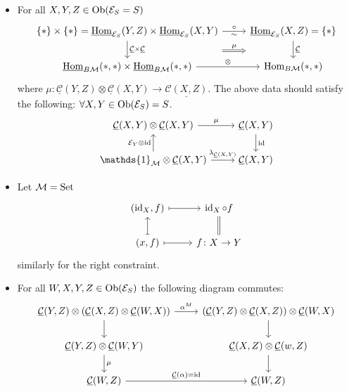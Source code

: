 \begin{exmp}
\begin{itemize}
		\item 
		For all $ X , Y , Z \in \operatorname{Ob} ( \mathcal{ E }_S = S ) $
		\[
		\begin{tikzcd}
			\{ * \} \times \{ * \} = \underline{\Hom}_{\mathcal{ E }_S } ( Y , Z ) \times \underline{ \Hom }_{ \mathcal{ E }_S } ( X , Y )
			\ar[r, "\sim"', "\circ"]
			\ar[r,shift right =2em, Rightarrow, "\mu"]
			\ar[d, "\underline{ \mathcal{ C } } \times \underline{ \mathcal{ C } }"]
			&
			\underline{\Hom}_{\mathcal{E}_S}( X , Z ) = \{ * \}
			\ar[d, "\underline{\mathcal{C}}"]
			\\
			\underline{\Hom}_{B\mathcal{ M } } ( * , * ) \times
			\underline{\Hom}_{B \mathcal{ M } } ( * , * )
			\ar[r, "\otimes"]
			&
			\Hom_{B\mathcal{ M } } ( * , * )
		\end{tikzcd}
		\]
		where $ \mu \colon \underline{\mathcal{ C }}( Y , Z ) \otimes \underline{ \mathcal{ C } } ( X , Y ) \to \underline{ \mathcal{ C } ( X , Z ) }$.
		The above data should satisfy the following:
		$ \forall X , Y \in \operatorname{Ob} ( \mathcal{ E }_S ) = S $.
		\[
		\begin{tikzcd}
			\underline{ \mathcal{ C } } ( X , Y ) \otimes \underline{ \mathcal{ C } } ( X , Y ) 
			\ar[r, "\mu"]
			&
			\underline{ \mathcal{ C } } ( X , Y )
			\ar[d, " \id "]
			\\
			\mathds{ 1 }_{ \mathcal{ M } } \otimes \underline{ \mathcal{ C } } ( X , Y )
			\ar[r, " \lambda_{ \underline{\mathcal{ C }} ( X , Y )} "]
			\ar[u, " \mathcal{ E }_Y \otimes \id"]
			&
			\underline{ \mathcal{C} }( X , Y )
		\end{tikzcd}
		\]
		
		\item 
		Let $ \mathcal{ M } = \operatorname{Set} $
		\[
		\begin{tikzcd}
			( \id_X , f )
			\ar[r, mapsto]
			&
			\id_X \circ f 
			\ar[d, equal]
			\\
			( x , f )
			\ar[u , mapsto]
			\ar[r, mapsto]
			&
			f \colon X \to Y
		\end{tikzcd}
		\]
		similarly for the right constraint.
		
		\item 
		For all $ W , X , Y , Z \in \operatorname{Ob} ( \mathcal{E }_S ) $ the following diagram commutes:
		\[
		\begin{tikzcd}
			\underline{\mathcal{ C } } ( Y , Z ) \otimes  ( \underline{\mathcal{ C } } ( X , Z ) \otimes \underline{\mathcal{ C } } ( W , X ) )
			\ar[d]
			\ar[r, " \alpha^M " ]
			&
			( \underline{\mathcal{ C } } ( Y , Z ) \otimes   \underline{\mathcal{ C } } ( X , Z ) ) \otimes \underline{\mathcal{ C } } ( W , X ) 
			\ar[d]
			\\
			\underline{ \mathcal{ C } } ( Y , Z ) \otimes 
			\underline{ \mathcal{ C } } ( W , Y )
			\ar[d, " \mu" ]
			&
			\underline{\mathcal{ C } } ( X , Z ) \otimes
			\underline{\mathcal{ C } } ( w , Z )
			\ar[d]
			\\
			\underline{ \mathcal{ C } } ( W , Z )
			\ar[r, " \underline{\mathcal{ C}} ( \alpha ) = \id "]
			&
			\underline{\mathcal{ C } } ( W , Z )
		\end{tikzcd}
		\] 
	\end{itemize}
\end{exmp}

